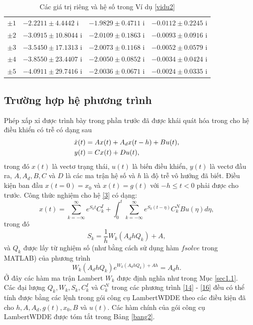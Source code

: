 \begin{vd}
\begin{table}[ht]
\begin{tabular}{llll}
			$\pm1$ & $-2.2211\pm 4.4442$ i & $-1.9829 \pm  0.4711$ i & $-0.0112\pm 0.2245$ i \\ 
			
			$\pm2$ & $- 3.0915\pm 10.8044$ i & $-2.0109 \pm  0.1863$ i & $- 0.0093\pm 0.0916$ i \\ 
			
			$\pm3$ & $- 3.5450 \pm 17.1313$ i & $-2.0073 \pm  0.1168$ i & $- 0.0052 \pm  0.0579$ i \\ 
			
			$\pm4$ & $-3.8550 \pm  23.4407$ i & $-2.0050 \pm  0.0852$ i & $-0.0034 \pm  0.0424$ i  \\
			
			$\pm5$ & $ -4.0911 \pm  29.7416$ i & $-2.0036 \pm  0.0671$ i & $-0.0024 \pm  0.0335$ i \\
			
			\hline 
		\end{tabular}
		\caption{Các giá trị riêng và hệ số trong Ví dụ \ref{vidu2}}
		\label{bang1} 
	\end{table}%
\end{vd} 

\subsection{Trường hợp hệ phương trình}
\noindent Phép xấp xỉ được trình bày trong phần trước đã được khái quát hóa trong \cite{Yi10} cho hệ điều khiển có trễ có dạng sau
%
\begin{align}\label{13}
\dot{x}(t) & =Ax(t)+A_dx(t-h)+Bu(t), \\
y(t)&=Cx(t)+Du(t), \notag 
\end{align}
%
trong đó $x(t)$ là vectơ trạng thái, $u(t)$ là biến điều khiển, $y(t)$ là vectơ đầu ra, $A, A_d, B, C$ và $D$ là các ma trận hệ số và $h$ là độ trễ vô hướng đã biết. Điều kiện ban đầu $x(t=0)=x_0$ và $x(t)=g(t)$ với $-h\leq t <0$ phải được cho trước. Công thức nghiệm cho hệ \eqref{3} có dạng:
%
\begin{equation}\label{14}
x(t) = \sum\limits^\infty_{k=-\infty}e^{S_kt}C^I_k+\int^t_0\sum\limits^\infty_{k=-\infty}e^{S_k(t-\eta)}C^N_kBu(\eta)d\eta,
\end{equation} 
trong đó
\begin{equation}\label{15}
S_k=\dfrac{1}{h}W_k(A_dhQ_k)+A,
\end{equation} 
và $Q_k$ được lấy từ nghiệm số (như bằng cách sử dụng hàm $fsolve$ trong MATLAB) của phương trình
%
\begin{equation}\label{16}
W_k(A_dhQ_k)e^{W_k(A_dhQ_k)+Ah}=A_dh.
\end{equation} 
%
Ở đây các hàm ma trận Lambert $W_k$ được định nghĩa như trong Mục \ref{sec1.1}. 
Các đại lượng $Q_k, W_k, S_k, C^I_k$ và $C^N_k$ trong các phương trình \eqref{14} - \eqref{16} đều có thể tính được bằng các lệnh trong gói công cụ LambertWDDE theo các điều kiện đã cho $h, A, A_d, g(t), x_0, B$ và $u(t)$. Các hàm chính của gói công cụ LambertWDDE được tóm tắt trong Bảng \ref{bang2}. 

